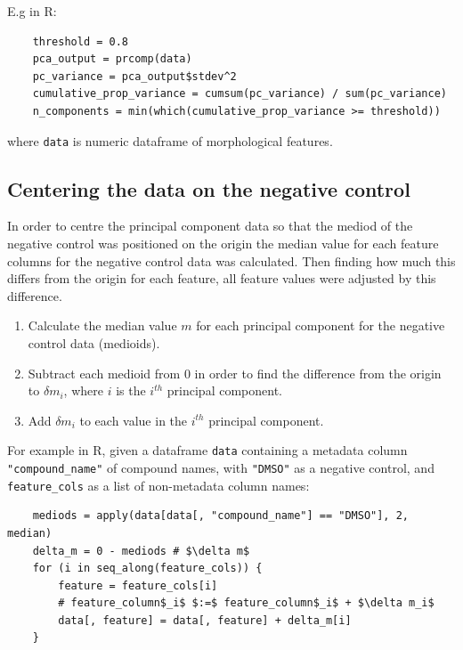 \documentclass[a4paper,11pt,twoside,openright]{scrbook}
\begin{document}
E.g in R:

\begin{verbatim}
    threshold = 0.8
    pca_output = prcomp(data)
    pc_variance = pca_output$stdev^2
    cumulative_prop_variance = cumsum(pc_variance) / sum(pc_variance)
    n_components = min(which(cumulative_prop_variance >= threshold)) 
\end{verbatim}
where \texttt{data} is numeric dataframe of morphological features.


\subsection{Centering the data on the negative control}

In order to centre the principal component data so that the mediod of the negative control was positioned on the origin the median value for each feature columns for the negative control data was calculated.
Then finding how much this differs from the origin for each feature, all feature values were adjusted by this difference.

\begin{enumerate}
    \item Calculate the median value $m$ for each principal component for the negative control data (medioids).
    \item Subtract each medioid from 0 in order to find the difference from the origin to $\delta m_i$, where $i$ is the $i^{th}$ principal component.
    \item Add $\delta m_i$ to each value in the $i^{th}$ principal component.
\end{enumerate}

For example in R, given a dataframe \texttt{data} containing a metadata column \texttt{"compound\_name"} of compound names, with \texttt{"DMSO"} as a negative control, and \texttt{feature\_cols} as a list of non-metadata column names:


\begin{verbatim}
    mediods = apply(data[data[, "compound_name"] == "DMSO"], 2, median)
    delta_m = 0 - mediods # $\delta m$
    for (i in seq_along(feature_cols)) {
        feature = feature_cols[i]
        # feature_column$_i$ $:=$ feature_column$_i$ + $\delta m_i$
        data[, feature] = data[, feature] + delta_m[i]
    }
\end{verbatim}
\end{document}
